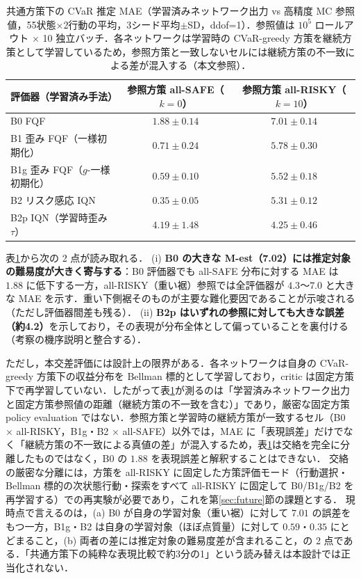 \documentclass[a4paper,10pt]{jsarticle}
\theoremstyle{definition}
\begin{document}
\begin{table}[htbp]
\centering
\caption{共通方策下の CVaR 推定 MAE（学習済みネットワーク出力 vs 高精度 MC 参照値，55状態$\times$2行動の平均，3シード平均$\pm$SD，ddof=1）．参照値は $10^5$ ロールアウト $\times$ 10 独立バッチ．各ネットワークは学習時の CVaR-greedy 方策を継続方策として学習しているため，参照方策と一致しないセルには継続方策の不一致による差が混入する（本文参照）．}
\label{tab:B2}
\small
\setlength{\tabcolsep}{4pt}
\begin{tabular}{lcc}
\toprule
評価器（学習済み手法） & 参照方策 all-SAFE（$k=0$） & 参照方策 all-RISKY（$k=10$）\\
\midrule
B0 FQF & $1.88\pm0.14$ & $7.01\pm0.14$\\
B1 歪み FQF（一様初期化） & $0.71\pm0.24$ & $5.78\pm0.30$\\
B1g 歪み FQF（$g$-一様初期化） & $0.59\pm0.10$ & $5.52\pm0.18$\\
B2 リスク感応 IQN & $\mathbf{0.35\pm0.05}$ & $5.31\pm0.12$\\
B2p IQN（学習時歪み $\tau$） & $4.19\pm1.48$ & $4.25\pm0.46$\\
\bottomrule
\end{tabular}
\end{table}

表\ref{tab:B2}から次の 2 点が読み取れる．
(i) \textbf{B0 の大きな M-est（7.02）には推定対象の難易度が大きく寄与する}：B0 評価器でも all-SAFE 分布に対する MAE は $1.88$ に低下する一方，all-RISKY（重い裾）参照では全評価器が $4.3$〜$7.0$ と大きな MAE を示す．重い下側裾そのものが主要な難化要因であることが示唆される（ただし評価器間差も残る）．
(ii) \textbf{B2p はいずれの参照に対しても大きな誤差（約4.2）}を示しており，その表現が分布全体として偏っていることを裏付ける（考察の機序説明と整合する）．

ただし，本交差評価には設計上の限界がある．各ネットワークは自身の CVaR-greedy 方策下の収益分布を Bellman 標的として学習しており，critic は固定方策下で再学習していない．したがって表\ref{tab:B2}が測るのは「学習済みネットワーク出力と固定方策参照値の距離（継続方策の不一致を含む）」であり，厳密な固定方策 policy evaluation ではない．参照方策と学習時の継続方策が一致するセル（B0 $\times$ all-RISKY，B1g・B2 $\times$ all-SAFE）以外では，MAE に「表現誤差」だけでなく「継続方策の不一致による真値の差」が混入するため，表\ref{tab:B2}は交絡を完全に分離したものではなく，B0 の $1.88$ を表現誤差と解釈することはできない．
交絡の厳密な分離には，方策を all-RISKY に固定した方策評価モード（行動選択・Bellman 標的の次状態行動・探索をすべて all-RISKY に固定して B0/B1g/B2 を再学習する）での再実験が必要であり，これを第\ref{sec:future}節の課題とする．
現時点で言えるのは，(a) B0 が自身の学習対象（重い裾）に対して $7.01$ の誤差をもつ一方，B1g・B2 は自身の学習対象（ほぼ点質量）に対して $0.59$・$0.35$ にとどまること，(b) 両者の差には推定対象の難易度差が含まれること，の 2 点である．「共通方策下の純粋な表現比較で約3分の1」という読み替えは本設計では正当化されない．
\end{document}
